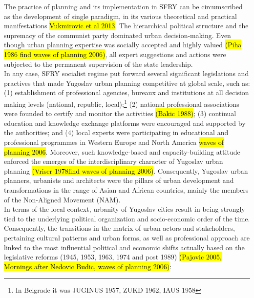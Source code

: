 \documentclass[11pt]{report}
\begin{document}
The practice of planning and its implementation in SFRY can be circumscribed as the development of single paradigm, in its various theoretical and practical manifestations \hl{Vukmirovic et al 2013}.
The hierarchical political structure and the supremacy of the communist party dominated urban decision-making.
Even though urban planning expertise was socially accepted and highly valued \hl{(Piha 1986 find waves of planning 2006)}, all expert suggestions and actions were subjected to the permanent supervision of the state leadership.
\\
In any case, SFRY socialist regime put forward several significant legislations and practives that made Yugoslav urban planning competitive at global scale, such as: 
(1) establishment of professional agencies, bureaux and institutions at all decision making levels (national, republic, local);\footnote{In Belgrade it was JUGINUS 1957, ZUKD 1962, IAUS 1958} (2) national professional associations were founded to certify and monitor the activities \hl{(Bakic 1988)}; (3) continual education and knowledge exchange platforms were encouraged and supported by the authorities; and (4) local experts were participating in educational and professional programmes in Western Europe and North America \hl{waves of planning 2006}.
Moreover, such knowledge-based and capacity-building attitude enforced the emerges of the interdisciplinary character of Yugoslav urban planning \hl{(Vriser 1978find waves of planning 2006)}.
Consequently, Yugoslav urban planners, urbanists and architects were the pillars of urban development and transformations in the range of Asian and African countries, mainly the members of the Non-Aligned Movement (NAM).
\\
In terms of the local context, urbanity of Yugoslav cities result in being strongly tied to the underlying political organization and socio-economic order of the time.
Consequently, the transitions in the matrix of urban actors and stakeholders, pertaining cultural patterns and urban forms, as well as professional approach are linked to the most influential political and economic shifts actually based on the legislative reforms (1945, 1953, 1963, 1974 and post 1989) \hl{(Pajovic 2005, Mornings after Nedovic Budic, waves of planning 2006)}:
\end{document}
